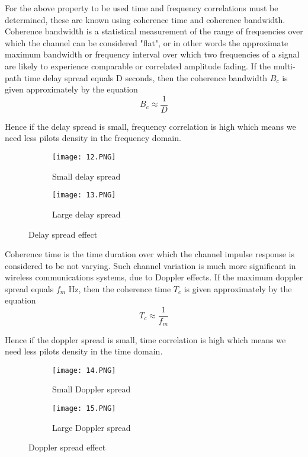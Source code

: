 For the above property to be used time and frequency correlations must be determined, these are known using coherence time and coherence bandwidth.
\newline\newline
Coherence bandwidth is a statistical measurement of the range of frequencies over which the channel can be considered "flat", or in other words the approximate maximum bandwidth or frequency interval over which two frequencies of a signal are likely to experience comparable or correlated amplitude fading. If the multi-path time delay spread equals D seconds, then the coherence bandwidth $B_c$ is given approximately by the equation
\begin{equation}
    \label{Coherence bandwidth}
    B_c \approx \frac{1}{D}
\end{equation}

Hence if the delay spread is small, frequency correlation is high which means we need less pilots density in the frequency domain.
\begin{figure}[ht]
\centering
    \begin{subfigure}[b]{0.4\textwidth}
        \centering
        \texttt{[image: 12.PNG]}
        \caption{Small delay spread }
    \end{subfigure}
    \hfill
    \begin{subfigure}[b]{0.4\textwidth}
        \centering
        \texttt{[image: 13.PNG]}
        \caption{Large delay spread }
    \end{subfigure}
       \caption{Delay spread effect}
\end{figure}

Coherence time is the time duration over which the channel impulse response is considered to be not varying. Such channel variation is much more significant in wireless communications systems, due to Doppler effects. If the maximum doppler spread equals $f_m$ Hz, then the coherence time $T_c$ is given approximately by the equation
\begin{equation}
    \label{Coherence time}
    T_c \approx \frac{1}{f_m}
\end{equation}

Hence if the doppler spread is small, time correlation is high which means we need less pilots density in the time domain.

\begin{figure}[ht]
\centering
    \begin{subfigure}[b]{0.4\textwidth}
        \centering
        \texttt{[image: 14.PNG]}
        \caption{Small Doppler spread }
    \end{subfigure}
    \hfill
    \begin{subfigure}[b]{0.4\textwidth}
        \centering
        \texttt{[image: 15.PNG]}
        \caption{Large Doppler spread}
    \end{subfigure}
       \caption{Doppler spread effect}
\end{figure}


